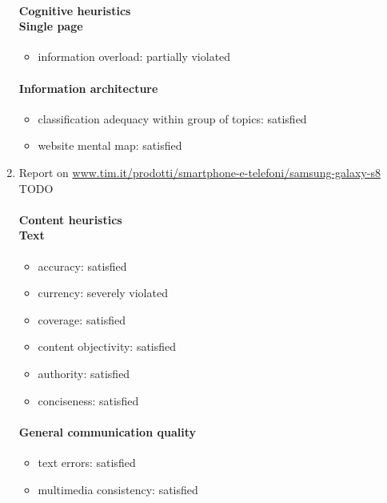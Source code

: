 \begin{enumerate}
	\paragraph*{Cognitive heuristics \\ Single page}
	\begin{itemize}
		\item information overload: partially violated
	\end{itemize}	

	\paragraph*{Information architecture}
	\begin{itemize}
		\item classification adequacy within group of topics: satisfied
		\item website mental map: satisfied
	\end{itemize}


\item Report on \url{www.tim.it/prodotti/smartphone-e-telefoni/samsung-galaxy-s8} TODO	
	\paragraph*{Content heuristics \\ Text}
	\begin{itemize}
		\item accuracy: satisfied
		\item currency: severely violated
		\item coverage: satisfied
		\item content objectivity: satisfied
		\item authority: satisfied
		\item conciseness: satisfied		
	\end{itemize}

	\paragraph*{General communication quality}
	\begin{itemize}
		\item text errors: satisfied
		\item multimedia consistency: satisfied
	\end{itemize}


\end{enumerate}
